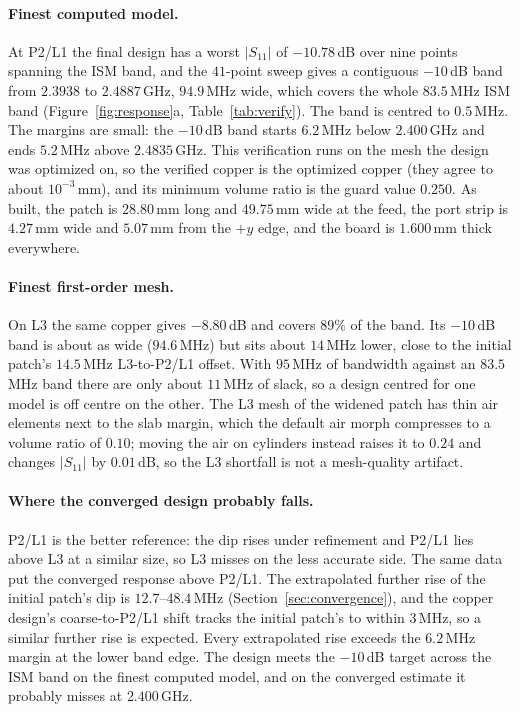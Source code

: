 \documentclass{anvil-paper}
\newcommand{\PL}{P2/L1}
\begin{document}
\paragraph{Finest computed model.}
At \PL{} the final design has a worst $|S_{11}|$ of $-10.78$\,dB over nine
points spanning the ISM band, and the $41$-point sweep gives a contiguous
$-10$\,dB band from $2.3938$ to $2.4887$\,GHz, $94.9$\,MHz wide, which covers
the whole $83.5$\,MHz ISM band (Figure~\ref{fig:response}a,
Table~\ref{tab:verify}). The band is centred to $0.5$\,MHz. The margins are
small: the $-10$\,dB band starts $6.2$\,MHz below $2.400$\,GHz and ends
$5.2$\,MHz above $2.4835$\,GHz. This verification runs on the mesh the
design was optimized on, so the verified copper is the optimized copper
(they agree to about $10^{-3}$\,mm), and its minimum volume ratio is the
guard value $0.250$. As built, the patch is $28.80$\,mm long and $49.75$\,mm
wide at the feed, the port strip is $4.27$\,mm wide and $5.07$\,mm from the
$+y$ edge, and the board is $1.600$\,mm thick everywhere.

\paragraph{Finest first-order mesh.}
On L3 the same copper gives $-8.80$\,dB and covers $89\%$ of the band. Its
$-10$\,dB band is about as wide ($94.6$\,MHz) but sits about $14$\,MHz lower,
close to the initial patch's $14.5$\,MHz L3-to-\PL{} offset. With $95$\,MHz
of bandwidth against an $83.5$\,MHz band there are only about $11$\,MHz of
slack, so a design centred for one model is off centre on the other. The
L3 mesh of the widened patch has thin air elements next to the slab
margin, which the default air morph compresses to a volume ratio of
$0.10$; moving the air on cylinders instead raises it to $0.24$ and changes
$|S_{11}|$ by $0.01$\,dB, so the L3 shortfall is not a mesh-quality
artifact.

\paragraph{Where the converged design probably falls.}
\PL{} is the better reference: the dip rises under refinement and \PL{}
lies above L3 at a similar size, so L3 misses on the less accurate side.
The same data put the converged response above \PL. The extrapolated
further rise of the initial patch's dip is $12.7$--$48.4$\,MHz
(Section~\ref{sec:convergence}), and the copper design's coarse-to-\PL{}
shift tracks the initial patch's to within $3$\,MHz, so a similar further
rise is expected. Every extrapolated rise exceeds the $6.2$\,MHz margin at
the lower band edge. The design meets the $-10$\,dB target across the ISM
band on the finest computed model, and on the converged estimate it
probably misses at $2.400$\,GHz.
\end{document}
